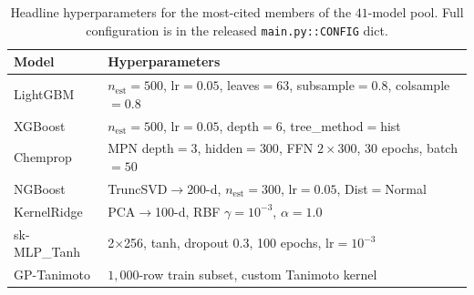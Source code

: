 \documentclass[conference]{IEEEtran}
\begin{document}
\begin{table}[t]
\centering
\caption{Headline hyperparameters for the most-cited members of the
$41$-model pool. Full configuration is in the released
\texttt{main.py::CONFIG} dict.}
\label{tab:hparams}
\scriptsize
\begin{tabular}{lp{5.0cm}}
\toprule
\textbf{Model} & \textbf{Hyperparameters} \\
\midrule
LightGBM      & $n_\text{est}\!=\!500$, lr$\!=\!0.05$, leaves$\!=\!63$,
                subsample$\!=\!0.8$, colsample$\!=\!0.8$ \\
XGBoost       & $n_\text{est}\!=\!500$, lr$\!=\!0.05$, depth$\!=\!6$,
                tree\_method$\!=\!$hist \\
Chemprop      & MPN depth$\!=\!3$, hidden$\!=\!300$, FFN $2\!\times\!300$,
                30 epochs, batch$\!=\!50$ \\
NGBoost       & TruncSVD$\to$200-d, $n_\text{est}\!=\!300$, lr$\!=\!0.05$,
                Dist$\!=\!$Normal \\
KernelRidge   & PCA$\to$100-d, RBF $\gamma\!=\!10^{-3}$,
                $\alpha\!=\!1.0$ \\
sk-MLP\_Tanh  & 2$\times$256, tanh, dropout 0.3,
                100 epochs, lr$\!=\!10^{-3}$ \\
GP-Tanimoto   & $1{,}000$-row train subset, custom Tanimoto kernel \\
\bottomrule
\end{tabular}
\end{table}
\end{document}
